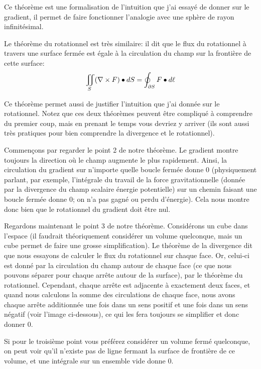 \documentclass[a4paper]{article}
\begin{document}
{{        Ce théorème est une formalisation de l'intuition que j'ai essayé de donner sur le gradient, il permet de faire fonctionner l'analogie avec une sphère de rayon infinitésimal.

        Le théorème du rotationnel est très similaire: il dit que le flux du rotationnel à travers une surface fermée est égale à la circulation du champ sur la frontière de cette surface:
        \[\iint_S \left(\nabla \times F\right) \dotprod dS = \oint_{\partial S} F \dotprod d \ell \]

        Ce théorème permet aussi de justifier l'intuition que j'ai donnée sur le rotationnel. Notez que ces deux théorèmes peuvent être compliqué à comprendre du premier coup, mais en prenant le temps vous devriez y arriver (ils sont aussi très pratiques pour bien comprendre la divergence et le rotationnel).
        
        Commençons par regarder le point 2 de notre théorème. Le gradient montre toujours la direction où le champ augmente le plus rapidement. Ainsi, la circulation du gradient sur n'importe quelle boucle fermée donne 0 (physiquement parlant, par exemple, l'intégrale du travail de la force gravitationnelle (donnée par la divergence du champ scalaire énergie potentielle) sur un chemin faisant une boucle fermée donne 0; on n'a pas gagné ou perdu d'énergie). Cela nous montre donc bien que le rotationnel du gradient doit être nul.

        Regardons maintenant le point 3 de notre théorème. Considérons un cube dans l'espace (il faudrait théoriquement considérer un volume quelconque, mais un cube permet de faire une grosse simplification). Le théorème de la divergence dit que nous essayons de calculer le flux du rotationnel sur chaque face. Or, celui-ci est donné par la circulation du champ autour de chaque face (ce que nous pouvons séparer pour chaque arrête autour de la surface), par le théorème du rotationnel. Cependant, chaque arrête est adjacente à exactement deux faces, et quand nous calculons la somme des circulations de chaque face, nous avons chaque arrête additionnée une fois dans un sens positif et une fois dans un sens négatif (voir l'image ci-dessous), ce qui les fera toujours se simplifier et donc donner 0.


        Si pour le troisième point vous préférez considérer un volume fermé quelconque, on peut voir qu'il n'existe pas de ligne fermant la surface de frontière de ce volume, et une intégrale sur un ensemble vide donne 0.

}}
\end{document}
